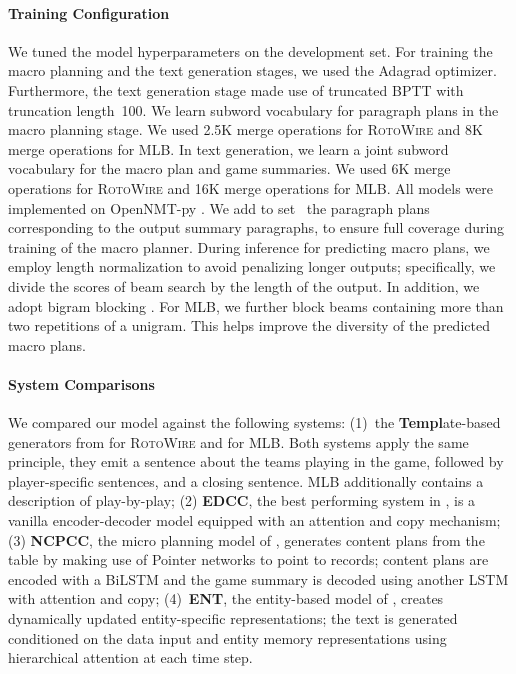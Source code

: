 \documentclass[11pt,a4paper]{article}
\begin{document}
\paragraph{Training Configuration}
We tuned the model hyperparameters on the development set. For
training the macro planning and the text generation stages, we used
the Adagrad \cite{DBLP:journals/jmlr/DuchiHS11}
optimizer. Furthermore, the text generation stage made use of
truncated BPTT \cite{DBLP:journals/neco/WilliamsP90} with truncation
length~100.  We learn subword vocabulary
\cite{sennrich-etal-2016-neural} for paragraph plans in the macro
planning stage. We used 2.5K merge operations for \textsc{RotoWire}
and 8K merge operations for MLB.  In text generation, we learn a joint
subword vocabulary for the macro plan and game summaries.  We used 6K
merge operations for \textsc{RotoWire} and 16K merge operations for
MLB. All models were implemented on OpenNMT-py \cite{klein-etal-2017-opennmt}.  We
add to set~ the paragraph plans corresponding to the
output summary paragraphs, to ensure full coverage during training of
the macro planner.  During inference for predicting macro plans, we 
employ length normalization
\cite{DBLP:journals/corr/BahdanauCB14} to avoid penalizing longer
outputs; specifically, we divide the scores of beam search by the
length of the output. In addition, we adopt bigram blocking
\cite{paulus2018a}. For MLB, we further block beams containing more
than two repetitions of a unigram. This helps improve the diversity of
the predicted macro plans.








\paragraph{System Comparisons}
We compared our model against the following systems: (1)~the
\textbf{Templ}ate-based generators from
\citet{wiseman-etal-2017-challenges} for \textsc{RotoWire} and
\citet{puduppully-etal-2019-data} for MLB. Both systems apply the same
principle, they emit a sentence about the teams playing in the game,
followed by player-specific sentences, and a closing sentence. MLB
additionally contains a description of play-by-play; (2)
\textbf{EDCC}, the best performing system in
\citet{wiseman-etal-2017-challenges}, is a vanilla encoder-decoder
model equipped with an attention and copy
mechanism; (3) \textbf{NCPCC}, the micro planning model of
\citet{DBLP:journals/corr/abs-1809-00582}, generates content plans
from the table by making use of Pointer networks \cite{NIPS2015_5866}
to point to records; content plans are encoded with a BiLSTM and the
game summary is decoded using another LSTM with attention and copy;
(4)~\textbf{ENT}, the entity-based model of
\citet{puduppully-etal-2019-data}, creates dynamically updated
entity-specific representations; the text is generated conditioned on
the data input and entity memory representations using hierarchical
attention at each time step.
\end{document}
